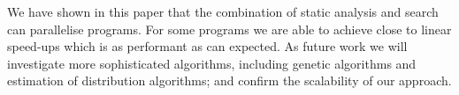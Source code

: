 We have shown in this paper that the combination of static analysis and search can
parallelise programs. For some programs we are able to achieve close to linear
speed-ups which is as performant as can expected. As future work we will investigate
more sophisticated algorithms, including genetic algorithms and estimation of distribution
algorithms; and confirm the scalability of our approach.


